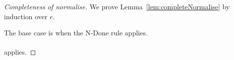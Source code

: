 \begin{proof}[Completeness of normalise]
  We prove Lemma~\ref{lem:completeNormalise} by induction over $e$.


  The base case is when the N-Done rule applies.\\
  \\

   applies.

\end{proof}


